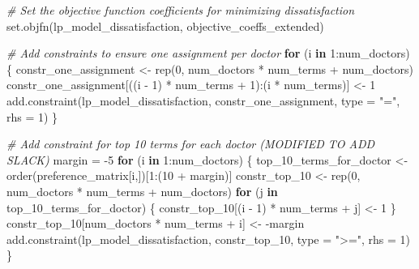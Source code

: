 \documentclass[
]{article}
\newenvironment{Shaded}{\begin{snugshade}}{\end{snugshade}}
\newcommand{\AttributeTok}[1]{\textcolor[rgb]{0.77,0.63,0.00}{#1}}
\newcommand{\CommentTok}[1]{\textcolor[rgb]{0.56,0.35,0.01}{\textit{#1}}}
\newcommand{\ControlFlowTok}[1]{\textcolor[rgb]{0.13,0.29,0.53}{\textbf{#1}}}
\newcommand{\DecValTok}[1]{\textcolor[rgb]{0.00,0.00,0.81}{#1}}
\newcommand{\FunctionTok}[1]{\textcolor[rgb]{0.00,0.00,0.00}{#1}}
\newcommand{\NormalTok}[1]{#1}
\newcommand{\OtherTok}[1]{\textcolor[rgb]{0.56,0.35,0.01}{#1}}
\newcommand{\SpecialCharTok}[1]{\textcolor[rgb]{0.00,0.00,0.00}{#1}}
\newcommand{\StringTok}[1]{\textcolor[rgb]{0.31,0.60,0.02}{#1}}
\begin{document}
\begin{Shaded}
\begin{Highlighting}[]
    \CommentTok{\# Set the objective function coefficients for minimizing dissatisfaction}
    \FunctionTok{set.objfn}\NormalTok{(lp\_model\_dissatisfaction, objective\_coeffs\_extended)}

    \CommentTok{\# Add constraints to ensure one assignment per doctor}
    \ControlFlowTok{for}\NormalTok{ (i }\ControlFlowTok{in} \DecValTok{1}\SpecialCharTok{:}\NormalTok{num\_doctors) \{}
\NormalTok{        constr\_one\_assignment }\OtherTok{\textless{}{-}} \FunctionTok{rep}\NormalTok{(}\DecValTok{0}\NormalTok{, num\_doctors }\SpecialCharTok{*}\NormalTok{ num\_terms }\SpecialCharTok{+}\NormalTok{ num\_doctors)}
\NormalTok{        constr\_one\_assignment[((i }\SpecialCharTok{{-}} \DecValTok{1}\NormalTok{) }\SpecialCharTok{*}\NormalTok{ num\_terms }\SpecialCharTok{+} \DecValTok{1}\NormalTok{)}\SpecialCharTok{:}\NormalTok{(i }\SpecialCharTok{*}\NormalTok{ num\_terms)] }\OtherTok{\textless{}{-}} \DecValTok{1}
        \FunctionTok{add.constraint}\NormalTok{(lp\_model\_dissatisfaction, constr\_one\_assignment, }\AttributeTok{type =} \StringTok{"="}\NormalTok{, }\AttributeTok{rhs =} \DecValTok{1}\NormalTok{)}
\NormalTok{    \}}

    \CommentTok{\# Add constraint for top 10 terms for each doctor (MODIFIED TO ADD SLACK)}
\NormalTok{    margin }\OtherTok{=} \SpecialCharTok{{-}}\DecValTok{5}
    \ControlFlowTok{for}\NormalTok{ (i }\ControlFlowTok{in} \DecValTok{1}\SpecialCharTok{:}\NormalTok{num\_doctors) \{}
\NormalTok{        top\_10\_terms\_for\_doctor }\OtherTok{\textless{}{-}} \FunctionTok{order}\NormalTok{(preference\_matrix[i,])[}\DecValTok{1}\SpecialCharTok{:}\NormalTok{(}\DecValTok{10} \SpecialCharTok{+}\NormalTok{ margin)]}
\NormalTok{        constr\_top\_10 }\OtherTok{\textless{}{-}} \FunctionTok{rep}\NormalTok{(}\DecValTok{0}\NormalTok{, num\_doctors }\SpecialCharTok{*}\NormalTok{ num\_terms }\SpecialCharTok{+}\NormalTok{ num\_doctors)}
        \ControlFlowTok{for}\NormalTok{ (j }\ControlFlowTok{in}\NormalTok{ top\_10\_terms\_for\_doctor) \{}
\NormalTok{            constr\_top\_10[(i }\SpecialCharTok{{-}} \DecValTok{1}\NormalTok{) }\SpecialCharTok{*}\NormalTok{ num\_terms }\SpecialCharTok{+}\NormalTok{ j] }\OtherTok{\textless{}{-}} \DecValTok{1}
\NormalTok{        \}}
\NormalTok{        constr\_top\_10[num\_doctors }\SpecialCharTok{*}\NormalTok{ num\_terms }\SpecialCharTok{+}\NormalTok{ i] }\OtherTok{\textless{}{-}} \SpecialCharTok{{-}}\NormalTok{margin}
        \FunctionTok{add.constraint}\NormalTok{(lp\_model\_dissatisfaction, constr\_top\_10, }\AttributeTok{type =} \StringTok{"\textgreater{}="}\NormalTok{, }\AttributeTok{rhs =} \DecValTok{1}\NormalTok{)}
\NormalTok{    \}}
    

\end{Highlighting}
\end{Shaded}
\end{document}
